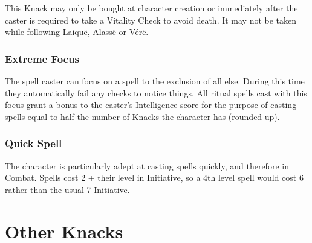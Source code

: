 \documentclass[titlepage,a4paper,openany]{book}
\begin{document}
\begin{multicols}{2}
This Knack may only be bought at character creation or immediately after the caster is required to take a Vitality Check to avoid death. It may not be taken while following Laiqu\"{e}, Alass\"{e} or V\'{e}r\"{e}.

\subsubsection{Extreme Focus}

The spell caster can focus on a spell to the exclusion of all else. During this time they automatically fail any checks to notice things. All ritual spells cast with this focus grant a bonus to the caster's Intelligence score for the purpose of casting spells equal to half the number of Knacks the character has (rounded up).

\subsubsection{Quick Spell}

The character is particularly adept at casting spells quickly, and therefore in Combat. Spells cost 2 + their level in Initiative, so a 4th level spell would cost 6 rather than the usual 7 Initiative.

\end{multicols}

\section{Other Knacks}
\end{document}
